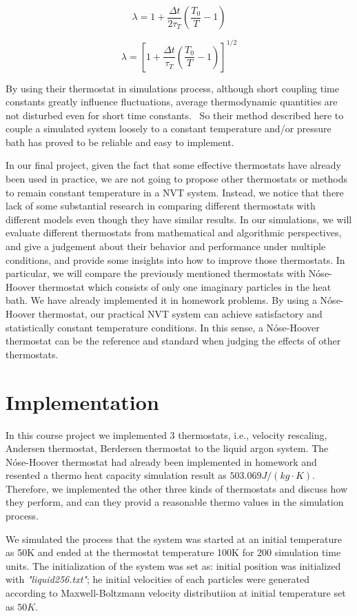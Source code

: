 \documentclass{article}
\begin{document}
\begin{spacing}{1}
$$\lambda=1+\frac{\Delta t}{2\tau_T}\left(\frac{T_0}{T}-1\right)$$

$$\lambda=\left[1+\frac{\Delta t}{\tau_T}\left(\frac{T_0}{T}-1\right)\right]^{1/2}$$

By using their thermostat in simulations process, although short coupling time constants greatly influence fluctuations, average thermodynamic quantities are not disturbed even for short time constants.  So their method described here to couple a simulated system loosely to a constant temperature and/or pressure bath has proved to be reliable and easy to implement.

In our final project, given the fact that some effective thermostats have already been used in practice, we are not going to propose other thermostats or methods to remain constant temperature in a NVT system. Instead, we notice that there lack of some substantial research in comparing different thermostats with different models even though they have similar results. In our simulations, we will evaluate different thermostats from mathematical and algorithmic perspectives, and give a judgement about their behavior and performance under multiple conditions, and provide some insights into how to improve those thermostats. In particular, we will compare the previously mentioned thermostats with Nóse-Hoover thermostat which consists of only one imaginary particles in the heat bath. We have already implemented it in homework problems. By using a Nóse-Hoover thermostat, our practical NVT system can achieve satisfactory and statistically constant temperature conditions. In this sense, a Nóse-Hoover thermostat can be the reference and standard when judging the effects of other thermostats.



\section{Implementation}

In this course project we implemented 3 thermostats, i.e., velocity rescaling, Andersen thermostat, Berdersen thermostat to the liquid argon system. The Nóse-Hoover thermostat had already been implemented in homework and resented a thermo heat capacity simulation result as $503.069J/(kg\cdot K)$. Therefore, we implemented the other three kinds of thermostats and discuss how they perform, and can they provid a reasonable thermo values in the simulation process.

We simulated the process that the system was started at an initial temperature as 50K and ended at the thermostat temperature 100K for 200 simulation time units. The initialization of the system was set as: initial position was initialized with {\it "liquid256.txt"}; he initial velocities of each particles were generated according to Maxwell-Boltzmann velocity distributiion at initial temperature set as $50K$.


\end{spacing}
\end{document}
